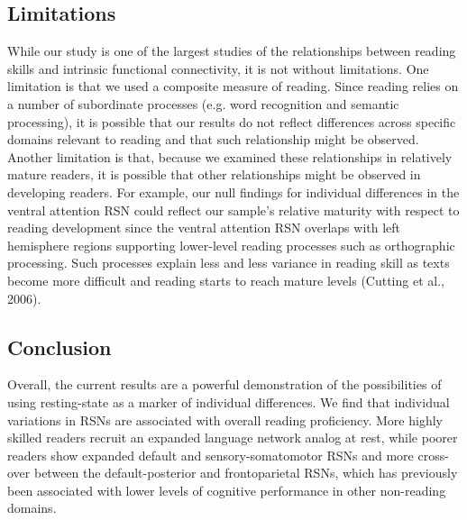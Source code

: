 \subsection{Limitations}

While our study is one of the largest studies of the relationships between reading skills and intrinsic functional connectivity, it is not without limitations. One limitation is that we used a composite measure of reading. Since reading relies on a number of subordinate processes (e.g. word recognition and semantic processing), it is possible that our results do not reflect differences across specific domains relevant to reading and that such relationship might be observed. Another limitation is that, because we examined these relationships in relatively mature readers, it is possible that other relationships might be observed in developing readers. For example, our null findings for individual differences in the ventral attention RSN could reflect our sample’s relative maturity with respect to reading development since the ventral attention RSN overlaps with left hemisphere regions supporting lower-level reading processes such as orthographic processing. Such processes explain less and less variance in reading skill as texts become more difficult and reading starts to reach mature levels (Cutting et al., 2006). 

\subsection{Conclusion}

Overall, the current results are a powerful demonstration of the possibilities of using resting-state as a marker of individual differences.  We find that individual variations in RSNs are associated with overall reading proficiency.  More highly skilled readers recruit an expanded language network analog at rest, while poorer readers show expanded default and sensory-somatomotor RSNs and more cross-over between the default-posterior and frontoparietal RSNs, which has previously been associated with lower levels of cognitive performance in other non-reading domains. 
